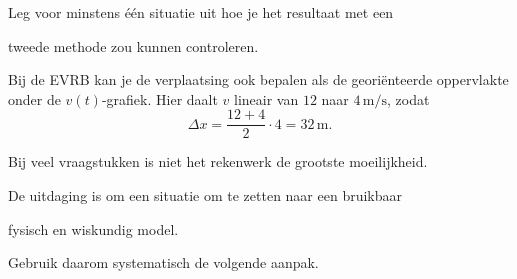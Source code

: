 \documentclass{ximera}
\begin{document}
\begin{oefening}{\oefG}
\begin{question}
\end{question}

\begin{question}

Leg voor minstens één situatie uit hoe je het resultaat met een

tweede methode zou kunnen controleren.

\begin{oplossing}
Bij de EVRB kan je de verplaatsing ook bepalen als de georiënteerde oppervlakte onder de \(v(t)\)-grafiek. Hier daalt \(v\) lineair van \(12\) naar \(4\,\mathrm{m/s}\), zodat
\[\Delta x=\frac{12+4}{2}\cdot4=32\,\mathrm{m}.\]
\end{oplossing}

\end{question}

\end{oefening}




Bij veel vraagstukken is niet het rekenwerk de grootste moeilijkheid.

De uitdaging is om een situatie om te zetten naar een bruikbaar

fysisch en wiskundig model.

Gebruik daarom systematisch de volgende aanpak.
\end{document}
